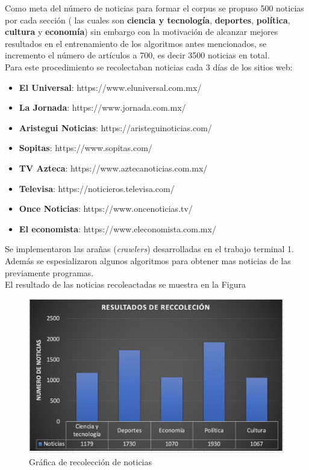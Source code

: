 Como meta del número de noticias para formar el corpus se propuso 500 noticias por cada sección ( las cuales son \textbf{ciencia y tecnología}, \textbf{deportes}, \textbf{política}, \textbf{cultura} y \textbf{economía}) sin embargo con la motivación de alcanzar mejores resultados en el entrenamiento de los algoritmos antes mencionados, se incremento el número de artículos a 700, es decir 3500 noticias en total.\\

Para este procedimiento se recolectaban noticias cada 3 días de los sitios web:

\begin{itemize}
	  \item \textbf{El Universal}: https://www.eluniversal.com.mx/
      \item \textbf{La Jornada}: https://www.jornada.com.mx/
	  \item \textbf{Aristegui Noticias}: https://aristeguinoticias.com/
	  \item \textbf{Sopitas}: https://www.sopitas.com/
      \item \textbf{TV Azteca}: https://www.aztecanoticias.com.mx/
      \item \textbf{Televisa}: https://noticieros.televisa.com/
      \item \textbf{Once Noticias}: https://www.oncenoticias.tv/
      \item \textbf{El economista}: https://www.eleconomista.com.mx/
\end{itemize}

Se implementaron las arañas (\textit{crawlers}) desarrolladas en el trabajo terminal 1. Además se espesializaron algunos algoritmos para obtener mas noticias de las previamente programas.\\

El resultado de las noticias recoleactadas se muestra en la Figura 

\begin{figure}[h]
\centering
\includegraphics[scale=0.35]{imagenes/Resultados/Recoleccion.png}
\caption{Gráfica de recolección de noticias}
\label{fig:recoleccion}
\end{figure}

